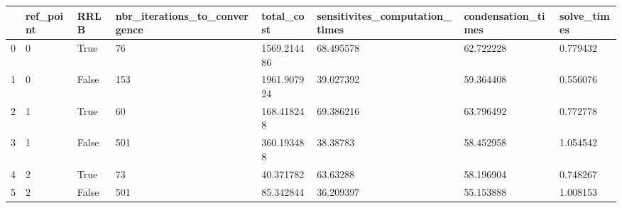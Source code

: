 \begin{tabular}{llllllll}
\toprule
{} & ref\_point &   RRLB & nbr\_iterations\_to\_convergence &   total\_cost & sensitivites\_computation\_times & condensation\_times & solve\_times \\
\midrule
0 &         0 &   True &                            76 &  1569.214486 &                      68.495578 &          62.722228 &    0.779432 \\
1 &         0 &  False &                           153 &  1961.907924 &                      39.027392 &          59.364408 &    0.556076 \\
2 &         1 &   True &                            60 &   168.418248 &                      69.386216 &          63.796492 &    0.772778 \\
3 &         1 &  False &                           501 &   360.193488 &                       38.38783 &          58.452958 &    1.054542 \\
4 &         2 &   True &                            73 &    40.371782 &                       63.63288 &          58.196904 &    0.748267 \\
5 &         2 &  False &                           501 &    85.342844 &                      36.209397 &          55.153888 &    1.008153 \\
\bottomrule
\end{tabular}
